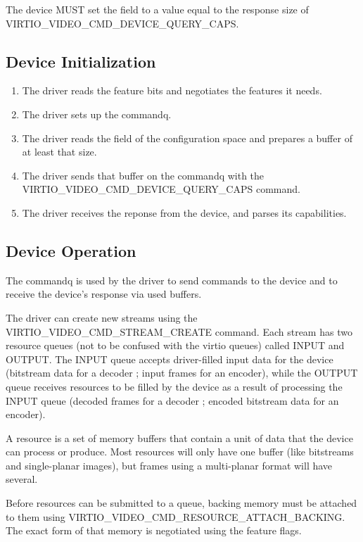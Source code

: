 The device MUST set the  field to a value equal to
the response size of VIRTIO_VIDEO_CMD_DEVICE_QUERY_CAPS.

\subsection{Device Initialization}\label{sec:Device Types / Video Device / Device Initialization}

\begin{enumerate}
\def\labelenumi{\arabic{enumi}.}
\item
  The driver reads the feature bits and negotiates the features it
  needs.
\item
  The driver sets up the commandq.
\item
  The driver reads the  field of the configuration
  space and prepares a buffer of at least that size.
\item
  The driver sends that buffer on the commandq with the
  VIRTIO_VIDEO_CMD_DEVICE_QUERY_CAPS command.
\item
  The driver receives the reponse from the device, and parses its
  capabilities.
\end{enumerate}

\subsection{Device Operation}\label{sec:Device Types / Video Device / Device Operation}

The commandq is used by the driver to send commands to the device and to
receive the device's response via used buffers.

The driver can create new streams using the
VIRTIO_VIDEO_CMD_STREAM_CREATE command. Each stream has two resource
queues (not to be confused with the virtio queues) called INPUT and
OUTPUT. The INPUT queue accepts driver-filled input data for the device
(bitstream data for a decoder ; input frames for an encoder), while the
OUTPUT queue receives resources to be filled by the device as a result
of processing the INPUT queue (decoded frames for a decoder ; encoded
bitstream data for an encoder).

A resource is a set of memory buffers that contain a unit of data that
the device can process or produce. Most resources will only have one
buffer (like bitstreams and single-planar images), but frames using a
multi-planar format will have several.

Before resources can be submitted to a queue, backing memory must be
attached to them using VIRTIO_VIDEO_CMD_RESOURCE_ATTACH_BACKING.
The exact form of that memory is negotiated using the feature flags.


